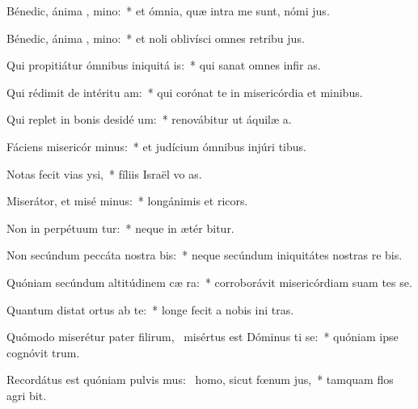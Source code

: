 \item Bénedic, ánima , mino:~* et ómnia, quæ intra me sunt, nómi  jus.
\item Bénedic, ánima , mino:~* et noli oblivísci omnes retribu jus.
\item Qui propitiátur ómnibus iniquitá is:~* qui sanat omnes infir as.
\item Qui rédimit de intéritu  am:~* qui corónat te in misericórdia et minibus.
\item Qui replet in bonis desidé um:~* renovábitur ut áquilæ  a.
\item Fáciens misericór minus:~* et judícium ómnibus injúri tibus.
\item Notas fecit vias  ysi,~* fíliis Israël vo as.
\item Miserátor, et misé minus:~* longánimis et  ricors.
\item Non in perpétuum tur:~* neque in ætér bitur.
\item Non secúndum peccáta nostra  bis:~* neque secúndum iniquitátes nostras re bis.
\item Quóniam secúndum altitúdinem cæ  ra:~* corroborávit misericórdiam suam  tes se.
\item Quantum distat ortus ab te:~* longe fecit a nobis ini tras.
\item Quómodo miserétur pater filirum,~\pscross{} misértus est Dóminus ti se:~* quóniam ipse cognóvit  trum.
\item Recordátus est quóniam pulvis mus:~\pscross{} homo, sicut fœnum  jus,~* tamquam flos agri  bit.
